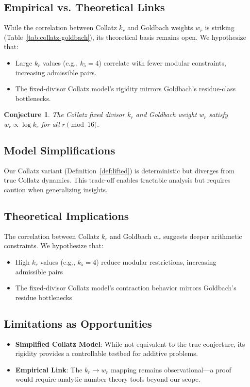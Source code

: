 \documentclass[12pt]{article}
\newtheorem{conjecture}[theorem]{Conjecture}
\begin{document}
	\subsection{Empirical vs. Theoretical Links}
	While the correlation between Collatz $k_r$ and Goldbach weights $w_r$ is striking (Table~\ref{tab:collatz-goldbach}), its theoretical basis remains open. We hypothesize that:
	\begin{itemize}
		\item Large $k_r$ values (e.g., $k_5=4$) correlate with fewer modular constraints, increasing admissible pairs.
		\item The fixed-divisor Collatz model’s rigidity mirrors Goldbach’s residue-class bottlenecks.
	\end{itemize}
	
	\begin{conjecture}\label{conj:kr-wr}  
		The Collatz fixed divisor \( k_r \) and Goldbach weight \( w_r \) satisfy \( w_r \propto \log k_r \) for all \( r \pmod{16} \).  
	\end{conjecture}  
	
	\subsection{Model Simplifications}
	Our Collatz variant (Definition~\ref{def:lifted}) is deterministic but diverges from true Collatz dynamics. This trade-off enables tractable analysis but requires caution when generalizing insights.	
	
	\subsection{Theoretical Implications} 
	The correlation between Collatz $k_r$ and Goldbach $w_r$ suggests deeper arithmetic constraints. We hypothesize that:
	\begin{itemize}
		\item High $k_r$ values (e.g., $k_5=4$) reduce modular restrictions, increasing admissible pairs
		\item The fixed-divisor Collatz model's contraction behavior mirrors Goldbach's residue bottlenecks
	\end{itemize}
	
	\subsection{Limitations as Opportunities}  
	\begin{itemize}
		\item \textbf{Simplified Collatz Model}: While not equivalent to the true conjecture, its rigidity provides a controllable testbed for additive problems.
		\item \textbf{Empirical Link}: The $k_r \to w_r$ mapping remains observational—a proof would require analytic number theory tools beyond our scope.
	\end{itemize}
	
\end{document}
